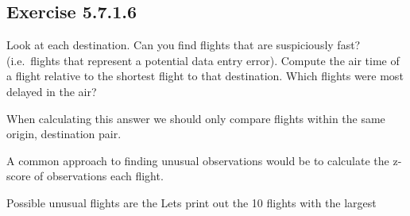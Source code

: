 \documentclass[]{book}
\newenvironment{Shaded}{\begin{snugshade}}{\end{snugshade}}
\newcommand{\CommentTok}[1]{\textcolor[rgb]{0.56,0.35,0.01}{\textit{#1}}}
\newcommand{\DataTypeTok}[1]{\textcolor[rgb]{0.13,0.29,0.53}{#1}}
\newcommand{\DecValTok}[1]{\textcolor[rgb]{0.00,0.00,0.81}{#1}}
\newcommand{\KeywordTok}[1]{\textcolor[rgb]{0.13,0.29,0.53}{\textbf{#1}}}
\newcommand{\NormalTok}[1]{#1}
\newcommand{\OperatorTok}[1]{\textcolor[rgb]{0.81,0.36,0.00}{\textbf{#1}}}
\newcommand{\StringTok}[1]{\textcolor[rgb]{0.31,0.60,0.02}{#1}}
\theoremstyle{plain}
\theoremstyle{remark}
\begin{document}
\hypertarget{exercise-5.7.1.6}{%
\subsection*{\texorpdfstring{Exercise
{5.7.1.6}}{Exercise 5.7.1.6}}\label{exercise-5.7.1.6}}

Look at each destination. Can you find flights that are suspiciously
fast? (i.e.~flights that represent a potential data entry error).
Compute the air time of a flight relative to the shortest flight to that
destination. Which flights were most delayed in the air?

When calculating this answer we should only compare flights within the
same origin, destination pair.

A common approach to finding unusual observations would be to calculate
the z-score of observations each flight.

\begin{Shaded}
\end{Shaded}

Possible unusual flights are the Lets print out the 10 flights with the
largest

\begin{Shaded}
\end{Shaded}
\end{document}

